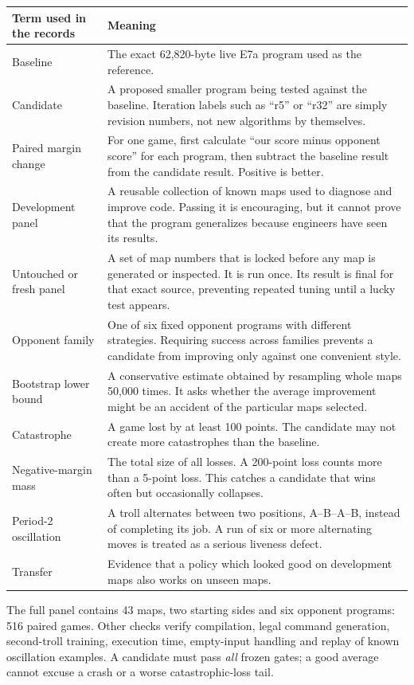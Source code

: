 \documentclass[10pt,a4paper]{article}
\begin{document}
\begin{tabularx}{\textwidth}{@{}p{38mm}Y@{}}
\toprule
\textbf{Term used in the records} & \textbf{Meaning} \\
\midrule
Baseline & The exact 62,820-byte live E7a program used as the reference. \\
Candidate & A proposed smaller program being tested against the baseline. Iteration labels such as
``r5'' or ``r32'' are simply revision numbers, not new algorithms by themselves. \\
Paired margin change & For one game, first calculate ``our score minus opponent score'' for each
program, then subtract the baseline result from the candidate result. Positive is better. \\
Development panel & A reusable collection of known maps used to diagnose and improve code. Passing
it is encouraging, but it cannot prove that the program generalizes because engineers have seen
its results. \\
Untouched or fresh panel & A set of map numbers that is locked before any map is generated or
inspected. It is run once. Its result is final for that exact source, preventing repeated tuning
until a lucky test appears. \\
Opponent family & One of six fixed opponent programs with different strategies. Requiring success
across families prevents a candidate from improving only against one convenient style. \\
Bootstrap lower bound & A conservative estimate obtained by resampling whole maps 50,000 times.
It asks whether the average improvement might be an accident of the particular maps selected. \\
Catastrophe & A game lost by at least 100 points. The candidate may not create more catastrophes
than the baseline. \\
Negative-margin mass & The total size of all losses. A 200-point loss counts more than a 5-point
loss. This catches a candidate that wins often but occasionally collapses. \\
Period-2 oscillation & A troll alternates between two positions, A--B--A--B, instead of completing
its job. A run of six or more alternating moves is treated as a serious liveness defect. \\
Transfer & Evidence that a policy which looked good on development maps also works on unseen maps. \\
\bottomrule
\end{tabularx}

The full panel contains 43 maps, two starting sides and six opponent programs: 516 paired games.
Other checks verify compilation, legal command generation, second-troll training, execution time,
empty-input handling and replay of known oscillation examples. A candidate must pass \emph{all}
frozen gates; a good average cannot excuse a crash or a worse catastrophic-loss tail.
\end{document}
